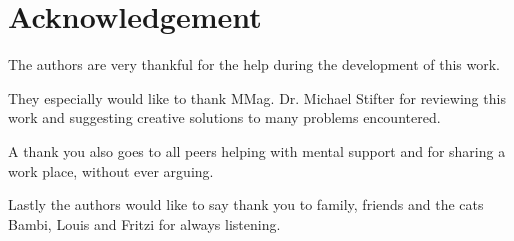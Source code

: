 \chapter{Acknowledgement}

The authors are very thankful for the help during the development of this work.


\vspace{5mm}
\noindent
They especially would like to thank MMag. Dr. Michael Stifter for reviewing this work and suggesting creative solutions to many problems encountered.

\vspace{5mm}
\noindent
A thank you also goes to all peers helping with mental support and for sharing a work place, without ever arguing.

\vspace{5mm}
\noindent
Lastly the authors would like to say thank you to family, friends and the cats Bambi, Louis and Fritzi for always listening.

